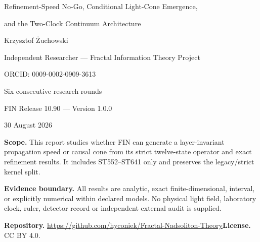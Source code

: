 \documentclass[11pt,a4paper]{article}
\theoremstyle{remark}\newtheorem{remark}[theorem]{Remark}
\begin{document}
\hypersetup{pageanchor=false}
\begin{titlepage}\centering\vspace*{14mm}{\Huge\bfseries FIN ST552--ST641\par}\vspace{4mm}
{\Large Refinement-Speed No-Go, Conditional Light-Cone Emergence,\par}{\Large and the Two-Clock Continuum Architecture\par}\vspace{12mm}
{\Large Krzysztof Żuchowski\par}{\normalsize Independent Researcher --- Fractal Information Theory Project\par}{\normalsize ORCID: 0009-0002-0909-3613\par}\vspace{9mm}
{\large Six consecutive research rounds\par}{\large FIN Release 10.90 --- Version 1.0.0\par}{\large 30 August 2026\par}\vfill
\begin{minipage}{.91\textwidth}\small
\textbf{Scope.} This report studies whether FIN can generate a layer-invariant propagation speed or causal cone from its strict twelve-state operator and exact refinement results. It includes ST552--ST641 only and preserves the legacy/strict kernel split.

\medskip\textbf{Evidence boundary.} All results are analytic, exact finite-dimensional, interval, or explicitly numerical within declared models. No physical light field, laboratory clock, ruler, detector record or independent external audit is supplied.

\medskip\textbf{Repository.} \url{https://github.com/hyconiek/Fractal-Nadsoliton-Theory}\qquad\textbf{License.} CC BY 4.0.
\end{minipage}\vfill\end{titlepage}\hypersetup{pageanchor=true}
\end{document}
